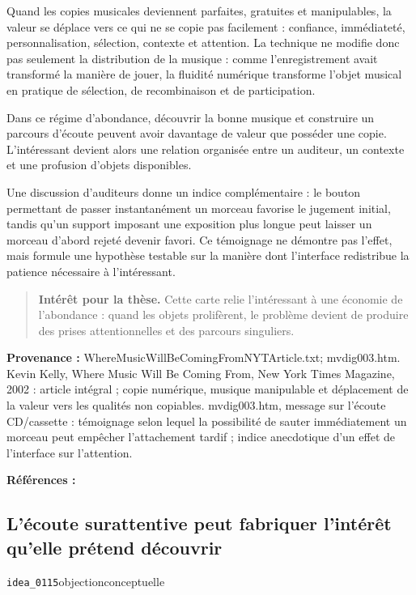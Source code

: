 \documentclass[10pt,a4paper]{article}
\begin{document}
Quand les copies musicales deviennent parfaites, gratuites et manipulables, la valeur se déplace vers ce qui ne se copie pas facilement : confiance, immédiateté, personnalisation, sélection, contexte et attention. La technique ne modifie donc pas seulement la distribution de la musique : comme l'enregistrement avait transformé la manière de jouer, la fluidité numérique transforme l'objet musical en pratique de sélection, de recombinaison et de participation.

Dans ce régime d'abondance, découvrir la bonne musique et construire un parcours d'écoute peuvent avoir davantage de valeur que posséder une copie. L'intéressant devient alors une relation organisée entre un auditeur, un contexte et une profusion d'objets disponibles.

Une discussion d'auditeurs donne un indice complémentaire : le bouton permettant de passer instantanément un morceau favorise le jugement initial, tandis qu'un support imposant une exposition plus longue peut laisser un morceau d'abord rejeté devenir favori. Ce témoignage ne démontre pas l'effet, mais formule une hypothèse testable sur la manière dont l'interface redistribue la patience nécessaire à l'intéressant.

\begin{quote}
\textbf{Intérêt pour la thèse.} Cette carte relie l'intéressant à une économie de l'abondance : quand les objets prolifèrent, le problème devient de produire des prises attentionnelles et des parcours singuliers.
\end{quote}
{\footnotesize\color{metadata}\textbf{Provenance :} WhereMusicWillBeComingFromNYTArticle.txt; mvdig003.htm. Kevin Kelly, Where Music Will Be Coming From, New York Times Magazine, 2002 : article intégral ; copie numérique, musique manipulable et déplacement de la valeur vers les qualités non copiables. mvdig003.htm, message sur l'écoute CD/cassette : témoignage selon lequel la possibilité de sauter immédiatement un morceau peut empêcher l'attachement tardif ; indice anecdotique d'un effet de l'interface sur l'attention.\par}
{\footnotesize\color{metadata}\textbf{Références :} \parencite{kelly2002music}\par}

\subsection{L'écoute surattentive peut fabriquer l'intérêt qu'elle prétend découvrir}
{\small\color{metadata} \texttt{idea\_0115}\quad\textbullet\quad objection\quad\textbullet\quad conceptuelle\par}
\end{document}
